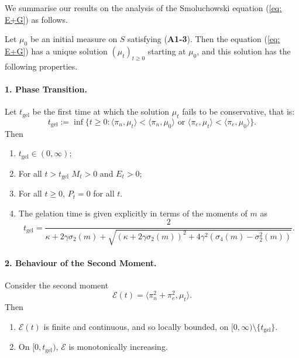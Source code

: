 We summarise our results on the analysis of the Smoluchowski equation (\ref{eq: E+G}) as follows.
\begin{theorem}\label{thrm: Smoluchowski equation}
Let $\mu_0$ be an initial measure on $S$ satisfying (\textbf{A1-3}). Then the equation (\ref{eq: E+G}) has a unique solution $(\mu_t)_{t\geq 0}$ starting at $\mu_0$, and this solution has the following properties.
\paragraph{1. Phase Transition.} Let $t_\mathrm{gel}$ be the first time at which the solution $\mu_t$ fails to be conservative, that is:
\begin{equation} t_\mathrm{gel}:=\inf\{t\ge 0: \langle \pi_n, \mu_t\rangle < \langle \pi_n, \mu_0\rangle \text{  or  } \langle \pi_e, \mu_t\rangle < \langle \pi_e, \mu_0\rangle\}.
\end{equation}
Then
\begin{enumerate}[label=\roman{*}).]
    \item $t_\mathrm{gel}\in(0,\infty)$;
    \item For all $t>t_\mathrm{gel}$ $M_t>0$ and $E_t>0$;
    \item For all $t\ge 0$, $P_t=0$ for all $t.$
    \item The gelation time is given explicitly in terms of the moments of $m$ as \begin{equation}
       t_\mathrm{gel}= \frac{2}{\kappa +2\gamma\sigma_2(m) + \sqrt{(\kappa+2\gamma\sigma_2(m))^2+4\gamma^2(\sigma_4(m)-\sigma_2^2(m))}}.
   \end{equation}
\end{enumerate}
\paragraph{2. Behaviour of the Second Moment.} Consider the second moment \begin{equation} \mathcal{E}(t)=\langle \pi_n^2+ \pi_e^2, \mu_t\rangle. \end{equation} Then \begin{enumerate}[label=\roman{*}).]
    \item $\mathcal{E}(t)$ is finite and continuous, and so locally bounded, on $[0, \infty)\setminus\{t_\mathrm{gel}\}.$ 

    \item On $[0, t_\mathrm{gel})$, $\mathcal{E}$ is monotonically increasing.
    

\end{enumerate}
\end{theorem}
